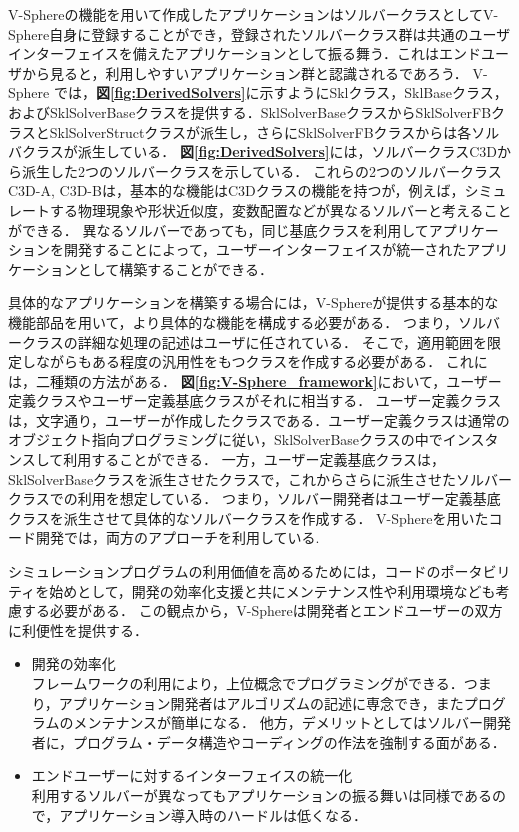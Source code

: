 V-Sphereの機能を用いて作成したアプリケーションはソルバークラスとしてV-Sphere自身に登録することができ，登録されたソルバークラス群は共通のユーザインターフェイスを備えたアプリケーションとして振る舞う．これはエンドユーザから見ると，利用しやすいアプリケーション群と認識されるであろう．
V-Sphere では，\textbf{図\ref{fig:DerivedSolvers}}に示すようにSklクラス，SklBaseクラス，およびSklSolverBaseクラスを提供する．SklSolverBaseクラスからSklSolverFBクラスとSklSolverStructクラスが派生し，さらにSklSolverFBクラスからは各ソルバクラスが派生している．
\textbf{図\ref{fig:DerivedSolvers}}には，ソルバークラスC3Dから派生した2つのソルバークラスを示している．
これらの2つのソルバークラスC3D-A, C3D-Bは，基本的な機能はC3Dクラスの機能を持つが，例えば，シミュレートする物理現象や形状近似度，変数配置などが異なるソルバーと考えることができる．
異なるソルバーであっても，同じ基底クラスを利用してアプリケーションを開発することによって，ユーザーインターフェイスが統一されたアプリケーションとして構築することができる．

具体的なアプリケーションを構築する場合には，V-Sphereが提供する基本的な機能部品を用いて，より具体的な機能を構成する必要がある．
つまり，ソルバークラスの詳細な処理の記述はユーザに任されている．
そこで，適用範囲を限定しながらもある程度の汎用性をもつクラスを作成する必要がある．
これには，二種類の方法がある．
\textbf{図\ref{fig:V-Sphere_framework}}において，ユーザー定義クラスやユーザー定義基底クラスがそれに相当する．
ユーザー定義クラスは，文字通り，ユーザーが作成したクラスである．ユーザー定義クラスは通常のオブジェクト指向プログラミングに従い，SklSolverBaseクラスの中でインスタンスして利用することができる．
一方，ユーザー定義基底クラスは，SklSolverBaseクラスを派生させたクラスで，これからさらに派生させたソルバークラスでの利用を想定している．
つまり，ソルバー開発者はユーザー定義基底クラスを派生させて具体的なソルバークラスを作成する．
V-Sphereを用いたコード開発では，両方のアプローチを利用している.

シミュレーションプログラムの利用価値を高めるためには，コードのポータビリティを始めとして，開発の効率化支援と共にメンテナンス性や利用環境なども考慮する必要がある．
この観点から，V-Sphereは開発者とエンドユーザーの双方に利便性を提供する．

\begin{itemize}
\item 開発の効率化\\
フレームワークの利用により，上位概念でプログラミングができる．つまり，アプリケーション開発者はアルゴリズムの記述に専念でき，またプログラムのメンテナンスが簡単になる．
他方，デメリットとしてはソルバー開発者に，プログラム・データ構造やコーディングの作法を強制する面がある．
\item エンドユーザーに対するインターフェイスの統一化\\
利用するソルバーが異なってもアプリケーションの振る舞いは同様であるので，アプリケーション導入時のハードルは低くなる．
\end{itemize}

